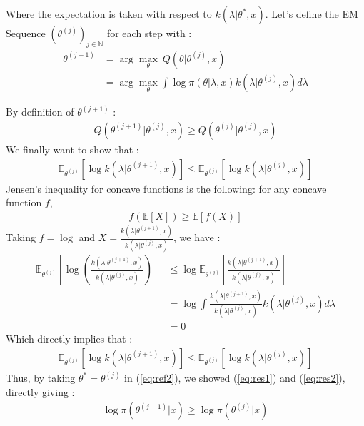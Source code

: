 \documentclass{article}
\newcommand{\N}{\mathbb N}
\begin{document}
\noindent Where the expectation is taken with respect to $k(\lambda | \theta^{*}, x)$. 
Let's define the EM Sequence $(\theta^{(j)})_{j\in \N}$  for each step with :
\begin{align*}
    \theta^{(j+1)} &= \arg \underset{\theta}{\max}  \  Q(\theta|\theta^{(j)}, x)  \\
    &=  \arg \underset{\theta}{\max} 
     \int \log\pi(\theta |\lambda, x) k(\lambda |\theta^{(j)}, x) d\lambda
\end{align*}

\noindent By definition of $\theta^{(j+1)}$ : 
\begin{align} \label{eq:res1}
    Q(\theta^{(j+1)}|\theta^{(j)}, x) \geq 
Q(\theta^{(j)}|\theta^{(j)}, x)
\end{align}
We finally want to show that :
\begin{align*}
    \mathbb{E}_{\theta^{(j)}}[\log k(\lambda | \theta^{(j+1)}, x)]
    \leq \mathbb{E}_{\theta^{(j)}}[\log k(\lambda | \theta^{(j)}, x)]
\end{align*}
Jensen's inequality for concave functions is the following: for any concave 
function $f$, 
\begin{align*}
    f(\mathbb{E}[X]) \geq \mathbb{E}[f(X)]
\end{align*}
Taking $f=\log$ and $X = \frac{k(\lambda | \theta^{(j+1)}, x)}{k(\lambda | \theta^{(j)}, x)}$, 
we have : 
\begin{align*}
    \mathbb{E}_{\theta^{(j)}} \left [
\log \left (
    \frac{k(\lambda | \theta^{(j+1)}, x)}{k(\lambda | \theta^{(j)}, x)}
\right )
    \right ]
    &\leq 
\log \mathbb{E}_{\theta^{(j)}} 
\left [
    \frac{k(\lambda | \theta^{(j+1)}, x)}{k(\lambda | \theta^{(j)}, x)}
\right ] \\
        &= \log \int    \frac{k(\lambda | \theta^{(j+1)}, x)}{k(\lambda | \theta^{(j)}, x)} k(\lambda|\theta^{(j)}, x) d\lambda \\
    &= 0
    \end{align*}
Which directly implies that : 
\begin{align}\label{eq:res2}
    \mathbb{E}_{\theta^{(j)}}[\log k(\lambda | \theta^{(j+1)}, x)]
    \leq \mathbb{E}_{\theta^{(j)}}[\log k(\lambda | \theta^{(j)}, x)]
\end{align}
Thus, by taking $\theta^* = \theta^{(j)}$ in (\ref{eq:ref2}), we showed (\ref{eq:res1}) and (\ref{eq:res2}), directly giving :
\begin{align*}
    \log \pi(\theta^{(j+1)} |x) \geq \log \pi(\theta^{(j)} |x)
\end{align*}
\end{document}

